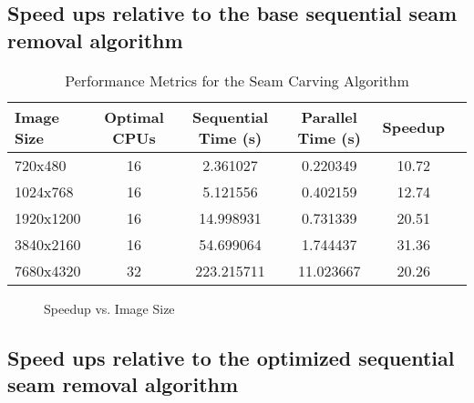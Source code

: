 \documentclass{article}
\begin{document}
\subsection{Speed ups relative to the base sequential seam removal algorithm}
\begin{table}[H]
    \centering
    \caption{Performance Metrics for the Seam Carving Algorithm}
    \begin{tabular}{lccccc}
        \toprule
        Image Size & Optimal CPUs & Sequential Time (s) & Parallel Time (s) & Speedup \\
        \midrule
        720x480   & 16           & 2.361027            & 0.220349          & 10.72  \\
        1024x768  & 16           & 5.121556            & 0.402159          & 12.74  \\
        1920x1200 & 16           & 14.998931           & 0.731339          & 20.51  \\
        3840x2160 & 16           & 54.699064           & 1.744437          & 31.36  \\
        7680x4320 & 32           & 223.215711          & 11.023667         & 20.26  \\
        \bottomrule
    \end{tabular}
    \label{tab:performance_summary}
\end{table}

\begin{figure}[H]
    \centering
    \caption{Speedup vs. Image Size}
    \label{fig:speedup_plot}
\end{figure}

\subsection{Speed ups relative to the optimized sequential seam removal algorithm}
\end{document}
